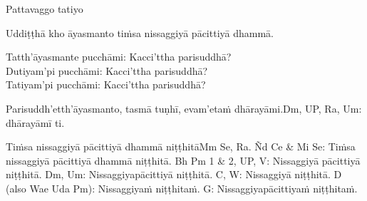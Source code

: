 \begin{center}
	Pattavaggo tatiyo
\end{center}



\medskip

\begin{center}
	Uddiṭṭhā kho āyasmanto tiṁsa nissaggiyā pācittiyā dhammā.

	\smallskip

	Tatth'āyasmante pucchāmi: Kacci'ttha parisuddhā?\\
	Dutiyam'pi pucchāmi: Kacci'ttha parisuddhā?\\
	Tatiyam'pi pucchāmi: Kacci'ttha parisuddhā?

	\smallskip

	Parisuddh'etth'āyasmanto, tasmā tuṇhī, evam'etaṁ dhārayāmi.\makeatletter\hyperlink{endnote-appendix}\makeatother Dm, UP, Ra, Um: dhārayāmī ti.
\end{center}

\begin{outro}
	Tiṁsa nissaggiyā pācittiyā dhammā niṭṭhitā\makeatletter\hyperlink{endnote-appendix}\makeatother Mm Se, Ra. Ñd Ce & Mi Se: Tiṁsa nissaggiyā pācittiyā dhammā niṭṭhitā. Bh Pm 1 & 2, UP, V: Nissaggiyā pācittiyā niṭṭhitā.
Dm,  Um:  Nissaggiyapācittiyā  niṭṭhitā.  C,  W:  Nissaggiyā  niṭṭhitā.  D  (also  Wae  Uda  Pm):  Nissaggiyaṁ  niṭṭhitaṁ. G:
Nissaggiyapācittiyaṁ niṭṭhitaṁ.
\end{outro}

\clearpage


